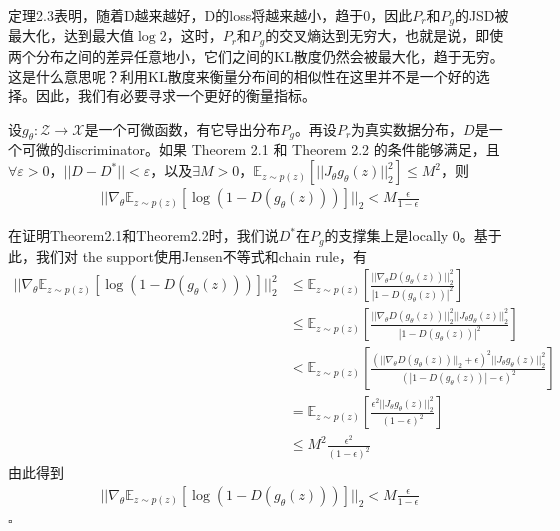             定理2.3表明，随着D越来越好，D的loss将越来越小，趋于0，因此$P_r$和$P_g$的JSD被最大化，达到最大值$\log2$，这时，$P_r$和$P_g$的交叉熵达到无穷大，也就是说，即使两个分布之间的差异任意地小，它们之间的KL散度仍然会被最大化，趋于无穷。这是什么意思呢？利用KL散度来衡量分布间的相似性在这里并不是一个好的选择。因此，我们有必要寻求一个更好的衡量指标。
            \begin{theorem}
            设$g_\theta:\mathcal{Z}\to \mathcal{X}$是一个可微函数，有它导出分布$P_g$。再设$P_r$为真实数据分布，$D$是一个可微的discriminator。如果 Theorem 2.1 和 Theorem 2.2 的条件能够满足，且$\forall \varepsilon>0 $，$||D-D^*||<\varepsilon$，以及$\exists M>0$，$\mathbb{E}_{z\sim p(z)}\left[||J_\theta g_\theta(z)||_2^2\right] \leqslant M^2$，则
            \begin{align*}
            ||\nabla_\theta \mathbb{E}_{z\sim p(z)}\left[\log(1-D(g_\theta(z)))\right]||_2 <M\frac{\epsilon}{1-\epsilon}
            \end{align*}
            \end{theorem}
            \begin{Proof}
            在证明Theorem2.1和Theorem2.2时，我们说$D^*$在$P_g$的支撑集上是locally 0。基于此，我们对 the support使用Jensen不等式和chain rule，有
            \begin{align*}
            ||\nabla_\theta \mathbb{E}_{z\sim p(z)}\left[\log(1-D(g_\theta(z)))\right]||_2^2 &\leqslant \mathbb{E}_{z\sim p(z)}\left[ \frac{||\nabla_\theta D(g_\theta(z))||_2^2}{|1-D(g_\theta(z))|^2} \right]\\
            & \leqslant \mathbb{E}_{z\sim p(z)}\left[ \frac{||\nabla_\theta D(g_\theta(z))||_2^2||J_\theta g_\theta(z)||_2^2}{|1-D(g_\theta(z))|^2} \right]\\
            &<\mathbb{E}_{z\sim p(z)}\left[ \frac{(||\nabla_\theta D(g_\theta(z))||_2+\epsilon)^2||J_\theta g_\theta(z)||_2^2}{(|1-D(g_\theta(z))|-\epsilon)^2} \right]\\
            &=\mathbb{E}_{z\sim p(z)} \left[\frac{\epsilon^2||J_{\theta}g_\theta(z)||_2^2}{(1-\epsilon)^2}  \right]\\
            & \leqslant M^2\frac{\epsilon^2}{(1-\epsilon)^2}
            \end{align*}
            由此得到
            \begin{align*}
            ||\nabla_\theta \mathbb{E}_{z\sim p(z)}\left[\log(1-D(g_\theta(z)))\right]||_2 <M\frac{\epsilon}{1-\epsilon}
            \end{align*}
            $\square$
            \end{Proof}
